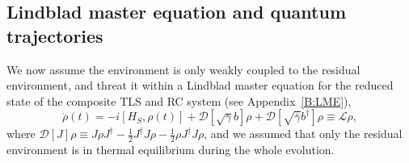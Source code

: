 \documentclass[%
preprint,
onecolumn,
notitlepag,
 amsmath,amssymb,
 aps,
 pra,
]{revtex4-2}
\begin{document}
\subsection{Lindblad master equation and quantum trajectories}

We now assume the environment is only weakly coupled to the residual environment, and threat it within a Lindblad master equation for the reduced state of the composite TLS and RC system (see Appendix~\ref{B:LME}),
\begin{equation}
\label{eq:LME}
\dot{\rho}(t) = -i [H_{S}, \rho(t)] + \mathcal{D}[\sqrt{\gamma} b] \rho + \mathcal{D}[\sqrt{\bar{\gamma}} b^{\dag}] \rho \equiv \mathcal{L}\rho,
\end{equation}
where $\mathcal{D}[J]\rho \equiv J\rho J^{\dag} - \frac{1}{2} J^{\dag} J \rho - \frac{1}{2}  \rho J^{\dag} J \rho$, and we assumed that only the residual environment is in thermal equilibrium during the whole evolution. 
\end{document}
